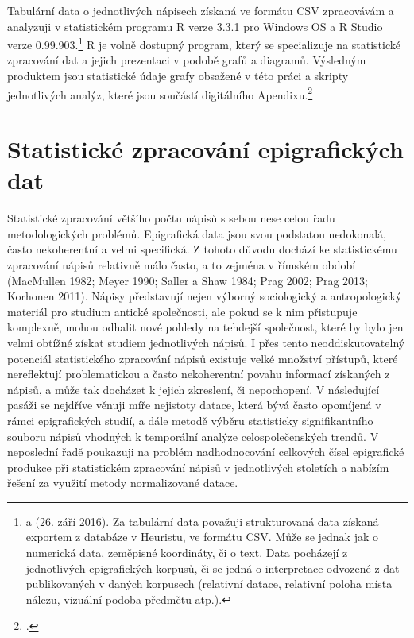 Tabulární data o jednotlivých nápisech získaná ve formátu CSV zpracovávám a analyzuji v statistickém programu R verze 3.3.1 pro Windows OS a R Studio verze 0.99.903.\footnote{\from[url15] a \from[url16] (26. září 2016). Za tabulární data považuji strukturovaná data získaná exportem z databáze v Heuristu, ve formátu CSV. Může se jednak jak o numerická data, zeměpisné koordináty, či o text. Data pocházejí z jednotlivých epigrafických korpusů, či se jedná o interpretace odvozené z dat publikovaných v daných korpusech (relativní datace, relativní poloha místa nálezu, vizuální podoba předmětu atp.).} R je volně dostupný program, který se specializuje na statistické zpracování dat a jejich prezentaci v podobě grafů a diagramů. Výsledným produktem jsou statistické údaje grafy obsažené v této práci a skripty jednotlivých analýz, které jsou součástí digitálního Apendixu.\footnote{\from[url17].}

\section[statistické-zpracování-epigrafických-dat]{Statistické zpracování epigrafických dat}

Statistické zpracování většího počtu nápisů s sebou nese celou řadu metodologických problémů. Epigrafická data jsou svou podstatou nedokonalá, často nekoherentní a velmi specifická. Z tohoto důvodu dochází ke statistickému zpracování nápisů relativně málo často, a to zejména v římském období (MacMullen 1982; Meyer 1990; Saller a Shaw 1984; Prag 2002; Prag 2013; Korhonen 2011). Nápisy představují nejen výborný sociologický a antropologický materiál pro studium antické společnosti, ale pokud se k nim přistupuje komplexně, mohou odhalit nové pohledy na tehdejší společnost, které by bylo jen velmi obtížné získat studiem jednotlivých nápisů. I přes tento neoddiskutovatelný potenciál statistického zpracování nápisů existuje velké množství přístupů, které nereflektují problematickou a často nekoherentní povahu informací získaných z nápisů, a může tak docházet k jejich zkreslení, či nepochopení. V následující pasáži se nejdříve věnuji míře nejistoty datace, která bývá často opomíjená v rámci epigrafických studií, a dále metodě výběru statisticky signifikantního souboru nápisů vhodných k temporální analýze celospolečenských trendů. V neposlední řadě poukazuji na problém nadhodnocování celkových čísel epigrafické produkce při statistickém zpracování nápisů v jednotlivých stoletích a nabízím řešení za využití metody normalizované datace.

